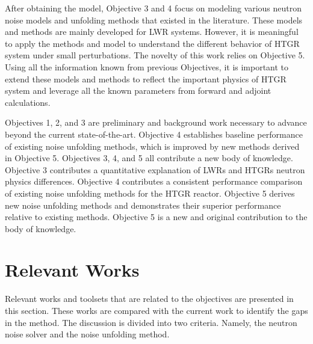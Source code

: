 After obtaining the model, Objective 3 and 4 focus on modeling various neutron noise models and unfolding methods that existed in the literature. These models and methods are mainly developed for \gls*{LWR} systems. However, it is meaningful to apply the methods and model to understand the different behavior of \gls*{HTGR} system under small perturbations. The novelty of this work relies on Objective 5. Using all the information known from previous Objectives, it is important to extend these models and methods to reflect the important physics of \gls*{HTGR} system and leverage all the known parameters from forward and adjoint calculations.

Objectives 1, 2, and 3 are preliminary and background work necessary to advance beyond the current state-of-the-art. Objective 4 establishes baseline performance of existing noise unfolding methods, which is improved by new methods derived in Objective 5. Objectives 3, 4, and 5 all contribute a new body of knowledge. Objective 3 contributes a quantitative explanation of \glspl*{LWR} and \glspl*{HTGR} neutron physics differences. Objective 4 contributes a consistent performance comparison of existing noise unfolding methods for the \gls*{HTGR} reactor. Objective 5 derives new noise unfolding methods and demonstrates their superior performance relative to existing methods. Objective 5 is a new and original contribution to the body of knowledge.

\section{Relevant Works}

Relevant works and toolsets that are related to the objectives are presented in this section. These works are compared with the current work to identify the gaps in the method. The discussion is divided into two criteria. Namely, the neutron noise solver and the noise unfolding method.

